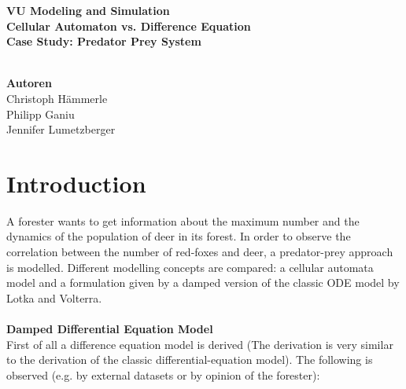 \documentclass[a4paper,12pt]{article}
\date{\vspace{-10ex}}
\begin{document}
\vspace*{10mm}
\begin{center}
\huge{\textbf{VU Modeling and Simulation}} \\
\vspace{20mm}
\Large{\textbf{Cellular Automaton vs. Difference Equation}}\\
\textbf{Case Study: Predator Prey System}\\ \ \\
\begin{large}
\textbf{Autoren}\\
    	Christoph Hämmerle\\
    	Philipp Ganiu\\
    	Jennifer Lumetzberger\\
\end{large}   	
\end{center}

\newpage
\tableofcontents
\newpage

\section{Introduction}
A forester wants to get information about the maximum number and the dynamics of the population of
deer in its forest. In order to observe the correlation between the number of red-foxes and deer, a predator-prey approach is modelled.
Different modelling concepts are compared: a cellular automata model and a formulation given by a damped version of the classic ODE model by Lotka and Volterra.\\ \ \\

\textbf{Damped Differential Equation Model} \\
First of all a difference equation model is derived (The derivation is very similar to the derivation of the
classic differential-equation model). The following is observed (e.g. by external datasets or by opinion of the forester):
\end{document}
